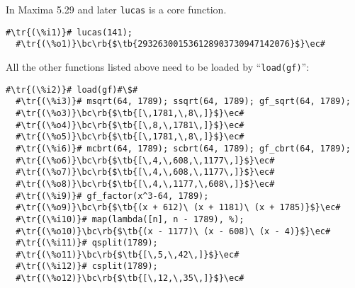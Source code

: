 \documentclass[a4paper,11pt,leqno,fleqn]{artikel3}
\newcommand{\bc}{\begin{center}}
\newcommand{\ec}{\end{center}}
\newcommand{\tr}[1]{\textcolor{red}{#1}}
\newcommand{\tb}[1]{\textcolor{blue}{#1}}
\newcommand{\rb}[1]{\raisebox{2mm}[0mm][1mm]{#1}}
\begin{document}
In Maxima 5.29 and later \verb!lucas! is a core function.

\vspace*{2mm}
\begin{lstlisting}[escapechar=\#]
  #\tr{(\%i1)}# lucas(141);
  #\tr{(\%o1)}\bc\rb{$\tb{293263001536128903730947142076}$}\ec#
\end{lstlisting}

All the other functions listed above need to be loaded by ``\verb!load(gf)!'':

\vspace*{2mm}
\begin{lstlisting}[escapechar=\#]
  #\tr{(\%i2)}# load(gf)#\$#
  #\tr{(\%i3)}# msqrt(64, 1789); ssqrt(64, 1789); gf_sqrt(64, 1789);
  #\tr{(\%o3)}\bc\rb{$\tb{[\,1781,\,8\,]}$}\ec#
  #\tr{(\%o4)}\bc\rb{$\tb{[\,8,\,1781\,]}$}\ec#
  #\tr{(\%o5)}\bc\rb{$\tb{[\,1781,\,8\,]}$}\ec#
  #\tr{(\%i6)}# mcbrt(64, 1789); scbrt(64, 1789); gf_cbrt(64, 1789);
  #\tr{(\%o6)}\bc\rb{$\tb{[\,4,\,608,\,1177\,]}$}\ec#
  #\tr{(\%o7)}\bc\rb{$\tb{[\,4,\,608,\,1177\,]}$}\ec#
  #\tr{(\%o8)}\bc\rb{$\tb{[\,4,\,1177,\,608\,]}$}\ec#
  #\tr{(\%i9)}# gf_factor(x^3-64, 1789);
  #\tr{(\%o9)}\bc\rb{$\tb{(x + 612)\ (x + 1181)\ (x + 1785)}$}\ec#
  #\tr{(\%i10)}# map(lambda([n], n - 1789), %);
  #\tr{(\%o10)}\bc\rb{$\tb{(x - 1177)\ (x - 608)\ (x - 4)}$}\ec#
  #\tr{(\%i11)}# qsplit(1789);
  #\tr{(\%o11)}\bc\rb{$\tb{[\,5,\,42\,]}$}\ec#
  #\tr{(\%i12)}# csplit(1789);
  #\tr{(\%o12)}\bc\rb{$\tb{[\,12,\,35\,]}$}\ec#
\end{lstlisting}
\end{document}
